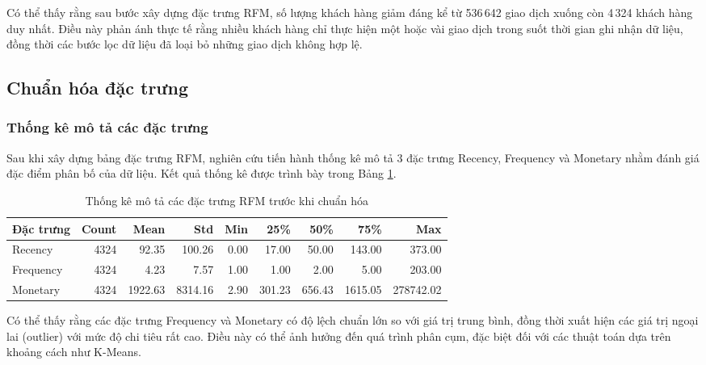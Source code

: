 \documentclass[12pt]{ai_conquer2026}
\begin{document}
Có thể thấy rằng sau bước xây dựng đặc trưng RFM, số lượng khách hàng giảm đáng kể từ 536\,642 giao dịch xuống còn 4\,324 khách hàng duy nhất. Điều này phản ánh thực tế rằng nhiều khách hàng chỉ thực hiện một hoặc vài giao dịch trong suốt thời gian ghi nhận dữ liệu, đồng thời các bước lọc dữ liệu đã loại bỏ những giao dịch không hợp lệ.

\subsection{Chuẩn hóa đặc trưng}

\subsubsection{Thống kê mô tả các đặc trưng}

Sau khi xây dựng bảng đặc trưng RFM, nghiên cứu tiến hành thống kê mô tả 3 đặc trưng Recency, Frequency và Monetary nhằm đánh giá đặc điểm phân bố của dữ liệu. Kết quả thống kê được trình bày trong Bảng \ref{tab:rfm_descriptive_statistics}.

\begin{table}[H]
\centering
\caption{Thống kê mô tả các đặc trưng RFM trước khi chuẩn hóa}
\label{tab:rfm_descriptive_statistics}
\begin{tabular}{lrrrrrrrr}
\toprule
\textbf{Đặc trưng} & 
\textbf{Count} & 
\textbf{Mean} & 
\textbf{Std} & 
\textbf{Min} & 
\textbf{25\%} & 
\textbf{50\%} & 
\textbf{75\%} & 
\textbf{Max} \\
\midrule

Recency 
& 4324 
& 92.35 
& 100.26 
& 0.00 
& 17.00 
& 50.00 
& 143.00 
& 373.00 \\

Frequency 
& 4324 
& 4.23 
& 7.57 
& 1.00 
& 1.00 
& 2.00 
& 5.00 
& 203.00 \\

Monetary 
& 4324 
& 1922.63 
& 8314.16 
& 2.90 
& 301.23 
& 656.43 
& 1615.05 
& 278742.02 \\

\bottomrule
\end{tabular}
\end{table}

Có thể thấy rằng các đặc trưng Frequency và Monetary có độ lệch chuẩn lớn so với giá trị trung bình, đồng thời xuất hiện các giá trị ngoại lai (outlier) với mức độ chi tiêu rất cao. Điều này có thể ảnh hưởng đến quá trình phân cụm, đặc biệt đối với các thuật toán dựa trên khoảng cách như K-Means.
\end{document}
